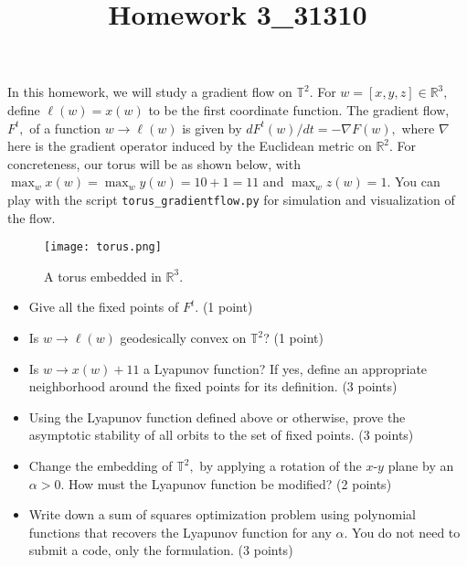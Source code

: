 \documentclass[12pt]{article}
\title{Homework 3_31310}
\begin{document}
\MakeScribeTop
In this homework, we will study a gradient flow on $\mathbb{T}^2.$ For $w = [x,y,z]\in \mathbb{R}^3,$ define $\ell(w) = x(w)$ to be the first coordinate function. 
The gradient flow, $F^t,$ of a function $w \to \ell(w)$ is given by $d F^t(w)/dt = -\nabla F(w),$ where $\nabla$ here is the gradient operator induced by the Euclidean metric on $\mathbb{R}^2.$ 
For concreteness, our torus will be as shown below, with $\max_{w} x(w) = \max_w y(w) = 10 + 1 = 11$ and $\max_w z(w) = 1.$ You can play with the script \verb+torus_gradientflow.py+ for simulation and visualization of the flow.
\begin{figure}[h!]
    \texttt{[image: torus.png]}
    \caption{A torus embedded in $\mathbb{R}^3.$}
\end{figure}
\begin{itemize}
    \item Give all the fixed points of $F^t.$ (1 point)
    \item Is $w\to \ell(w)$ geodesically convex on $\mathbb{T}^2$? (1 point) 
    \item Is $w \to x(w) + 11$ a Lyapunov function? If yes, define an appropriate neighborhood around the fixed points for its definition. (3 points)
    \item Using the Lyapunov function defined above or otherwise, prove the asymptotic stability of all orbits to the set of fixed points. (3 points)
    \item Change the embedding of $\mathbb{T}^2,$ by applying a rotation of the $x$-$y$ plane by an $\alpha > 0.$ How must the Lyapunov function be modified? (2 points)
    \item Write down a sum of squares optimization problem using polynomial functions that recovers the Lyapunov function for any $\alpha.$ You do not need to submit a code, only the formulation. (3 points) 
\end{itemize}
\end{document}
